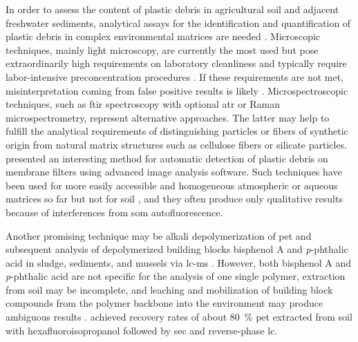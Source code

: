 In order to assess the content of plastic debris in agricultural soil and adjacent freshwater sediments, analytical assays for the identification and quantification of plastic debris in complex environmental matrices are needed \citep{BlasingPlastics2018}. Microscopic techniques, mainly light microscopy, are currently the most used but pose extraordinarily high requirements on laboratory cleanliness and typically require labor-intensive preconcentration procedures \citep{WoodallUsing2015}. If these requirements are not
met, misinterpretation coming from false positive results is likely \citep{LachenmeierMicroplastic2015}. Microspectroscopic techniques, such as \ac{ftir} spectroscopy with optional \ac{atr} or Raman microspectrometry, represent alternative approaches. The latter may help to fulfill the analytical requirements of distinguishing particles or fibers of synthetic origin from natural matrix structures such as cellulose fibers or silicate particles. \citet{PrimpkeAutomated2017} presented an interesting method for automatic detection of plastic debris on membrane filters using advanced image analysis software. Such techniques have been used for more easily accessible and homogeneous atmospheric or aqueous matrices so far but not for soil \citep{IoakeimidisDegradation2016,FischerIdentification2015,Comnea-StancuIdentification2016}, and they often produce only qualitative results \citep{BlasingPlastics2018} because of interferences from \ac{som} autofluorescence.

Another promising technique may be alkali depolymerization of \ac{pet} and subsequent analysis of depolymerized building blocks bisphenol A and \textit{p}-phthalic acid in sludge, sediments, and mussels via \ac{lc-ms} \citep{WangSimple2017}. However, both bisphenol A and \textit{p}-phthalic acid are not specific for the analysis of one single polymer, extraction from soil may be incomplete, and leaching and mobilization of building block compounds from the polymer backbone into the environment may produce ambiguous results \citep{WangSimple2017}. \citet{ElertComparison2017} achieved recovery rates of about \SI{80}{\percent} \ac{pet} extracted from soil with hexafluoroisopropanol followed by \ac{sec} and reverse-phase \ac{lc}.

